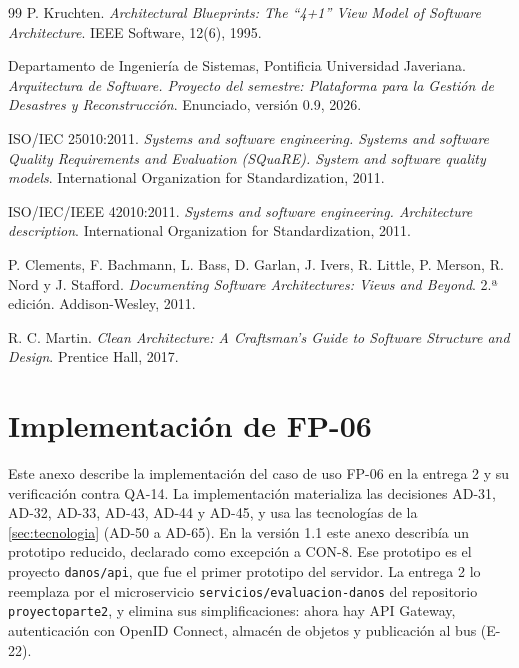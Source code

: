 \documentclass[11pt,letterpaper]{article}
\providecommand{\br}{\discretionary{}{}{}}
\begin{document}
\begin{thebibliography}{99}
P. Kruchten. \textit{Architectural Blueprints: The \enquote{4+1} View Model of Software
Architecture}. IEEE Software, 12(6), 1995.

Departamento de Ingeniería de Sistemas, Pontificia Universidad Javeriana. \textit{Arquitectura de
Software. Proyecto del semestre: Plataforma para la Gestión de Desastres y Reconstrucción}.
Enunciado, versión 0.9, 2026.

ISO/IEC 25010:2011. \textit{Systems and software engineering. Systems and software Quality
Requirements and Evaluation (SQuaRE). System and software quality models}. International
Organization for Standardization, 2011.

ISO/IEC/IEEE 42010:2011. \textit{Systems and software engineering. Architecture description}.
International Organization for Standardization, 2011.

P. Clements, F. Bachmann, L. Bass, D. Garlan, J. Ivers, R. Little, P. Merson, R. Nord y J. Stafford.
\textit{Documenting Software Architectures: Views and Beyond}. 2.ª edición. Addison-Wesley, 2011.

R. C. Martin. \textit{Clean Architecture: A Craftsman's Guide to Software Structure and Design}.
Prentice Hall, 2017.

\end{thebibliography}
\endgroup

\newpage
\appendix
\section{Implementación de FP-06}
\label{sec:anexo-a}

Este anexo describe la implementación del caso de uso FP-06 en la entrega 2 y su verificación
contra QA-14. La implementación materializa las decisiones AD-31, AD-32, AD-33,
AD-43, AD-44 y AD-45, y usa las tecnologías de la \cref{sec:tecnologia} (AD-50 a AD-65). En la
versión 1.1 este anexo describía un prototipo reducido, declarado como excepción a CON-8. Ese
prototipo es el proyecto \texttt{danos/api}, que fue el primer prototipo del servidor. La entrega 2
lo reemplaza por el microservicio \texttt{servicios/\br{}evaluacion-\br{}danos} del repositorio
\texttt{proyectoparte2}, y elimina sus simplificaciones: ahora hay API Gateway, autenticación con
OpenID Connect, almacén de objetos y publicación al bus (E-22).
\end{document}
